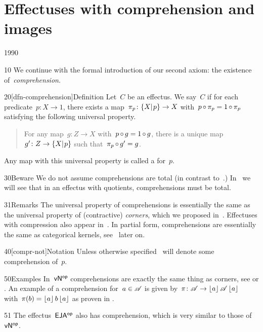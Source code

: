 \section{Effectuses with comprehension and images}
\begin{parsec}{1990}%
\begin{point}{10}%
We continue with the formal introduction
        of our second axiom:
        the existence of~\emph{comprehension}.
\end{point}
\begin{point}{20}[dfn-comprehension]{Definition}%
Let~$C$ be an effectus.
We say~$C$ 
    if for each predicate~$p \colon X \to 1$,
    there exists a map~$\pi_p \colon \{X|{\kern.2ex}p\} \to X$
    with~$p \mathop{\circ} \pi_p = 1 \mathop{\circ} \pi_p$
    satisfying the following universal property.
\begin{quote}
    For any map~$g\colon Z \to X$
        with~$p \mathop{\circ} g = 1 \mathop{\circ} g$,
        there is a unique map~$g' \colon Z \to \{X|{\kern.2ex}p\}$
        such that~$\pi_p \mathop{\circ} g' = g$.
\end{quote}
Any  map with this universal property
    is called a  for~$p$.
\begin{point}{30}{Beware}%
    We do not assume comprehensions are total
    (in contrast to~\cite{effintro}.)
    In~ we will see that
    in an effectus with quotients, comprehensions must be total.
\end{point}
\begin{point}{31}{Remarks}%
The universal property of comprehensions is essentially the same
    as the universal property of (contractive) \emph{corners},
    which we proposed in~\cite{westerbaan2016universal}.
Effectuses with compression also appear in~\cite{effintro}.
In partial form, comprehensions are
    essentially the same
    as categorical kernels, see~ later on.
\end{point}
\begin{point}{40}[compr-not]{Notation}%
    Unless otherwise specified~
        will denote some comprehension of~$p$.
\end{point}
\end{point}
\begin{point}{50}{Examples}%
In~${\mathsf{vN}}{^{\mathsf{op}}}$ comprehensions are exactly the same thing
    as corners, see  or .
An example of a comprehension for~$a \in \mathscr{A}$
    is given by~$\pi\colon \mathscr{A} \to \left\lfloor a\right\rfloor\mathscr{A}\left\lfloor a\right\rfloor$
    with~$\pi(b) = \left\lfloor a\right\rfloor b\left\lfloor a\right\rfloor$
    as proven in .
\begin{point}{51}%
The effectus~${\mathsf{EJA}}{^{\mathsf{op}}}$ also has comprehension,
    which is very similar to those of~${\mathsf{vN}}{^{\mathsf{op}}}$.~\cite[prop.~24]{eja}


\end{point}
\end{point}
\end{parsec}
